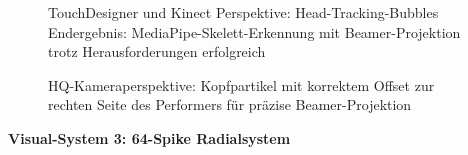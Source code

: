 \begin{figure}[htbp]
    \centering
    \caption{TouchDesigner und Kinect Perspektive: Head-Tracking-Bubbles Endergebnis: MediaPipe-Skelett-Erkennung mit Beamer-Projektion trotz Herausforderungen erfolgreich}
    \label{fig:head_result}
\end{figure}

\begin{figure}[htbp]
    \centering
    \caption{HQ-Kameraperspektive: Kopfpartikel mit korrektem Offset zur rechten Seite des Performers für präzise Beamer-Projektion}
    \label{fig:headtracking_hq_kamera_offset}
\end{figure}

\textbf{Visual-System 3: 64-Spike Radialsystem}

